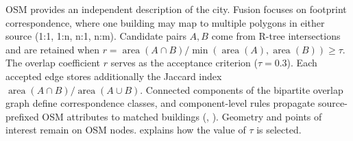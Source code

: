 \documentclass[sigconf,authordraft]{acmart}
\begin{document}
OSM provides an independent description of the city. Fusion focuses on footprint correspondence, where one building may map to multiple polygons in either source (1:1, 1:n, n:1, n:m). Candidate pairs $A, B$ come from R-tree intersections and are retained when  $r=\operatorname{area}(A\cap B)/\min(\operatorname{area}(A),\operatorname{area}(B))\ge\tau$.
The overlap coefficient \(r\) serves as the acceptance criterion (\(\tau = 0.3\)). Each accepted edge stores additionally the Jaccard index \(\operatorname{area}(A\cap B)/\operatorname{area}(A\cup B)\). 
Connected components of the bipartite overlap graph define correspondence classes, and component-level rules propagate source-prefixed OSM attributes to matched buildings (, ). Geometry and points of interest remain on OSM nodes.
 explains how the value of $\tau$ is selected. 
\end{document}

